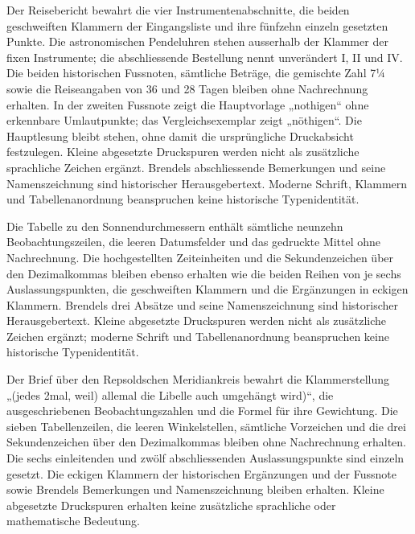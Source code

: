 Der Reisebericht bewahrt die vier Instrumentenabschnitte, die beiden geschweiften Klammern der Eingangsliste und ihre fünfzehn einzeln gesetzten Punkte. Die astronomischen Pendeluhren stehen ausserhalb der Klammer der fixen Instrumente; die abschliessende Bestellung nennt unverändert I, II und IV. Die beiden historischen Fussnoten, sämtliche Beträge, die gemischte Zahl 7¼ sowie die Reiseangaben von 36 und 28 Tagen bleiben ohne Nachrechnung erhalten. In der zweiten Fussnote zeigt die Hauptvorlage „nothigen“ ohne erkennbare Umlautpunkte; das Vergleichsexemplar zeigt „nöthigen“. Die Hauptlesung bleibt stehen, ohne damit die ursprüngliche Druckabsicht festzulegen. Kleine abgesetzte Druckspuren werden nicht als zusätzliche sprachliche Zeichen ergänzt. Brendels abschliessende Bemerkungen und seine Namenszeichnung sind historischer Herausgebertext. Moderne Schrift, Klammern und Tabellenanordnung beanspruchen keine historische Typenidentität.

Die Tabelle zu den Sonnendurchmessern enthält sämtliche neunzehn Beobachtungszeilen, die leeren Datumsfelder und das gedruckte Mittel ohne Nachrechnung. Die hochgestellten Zeiteinheiten und die Sekundenzeichen über den Dezimalkommas bleiben ebenso erhalten wie die beiden Reihen von je sechs Auslassungspunkten, die geschweiften Klammern und die Ergänzungen in eckigen Klammern. Brendels drei Absätze und seine Namenszeichnung sind historischer Herausgebertext. Kleine abgesetzte Druckspuren werden nicht als zusätzliche Zeichen ergänzt; moderne Schrift und Tabellenanordnung beanspruchen keine historische Typenidentität.

Der Brief über den Repsoldschen Meridiankreis bewahrt die Klammerstellung „(jedes 2mal, weil) allemal die Libelle auch umgehängt wird)“, die ausgeschriebenen Beobachtungszahlen und die Formel für ihre Gewichtung. Die sieben Tabellenzeilen, die leeren Winkelstellen, sämtliche Vorzeichen und die drei Sekundenzeichen über den Dezimalkommas bleiben ohne Nachrechnung erhalten. Die sechs einleitenden und zwölf abschliessenden Auslassungspunkte sind einzeln gesetzt. Die eckigen Klammern der historischen Ergänzungen und der Fussnote sowie Brendels Bemerkungen und Namenszeichnung bleiben erhalten. Kleine abgesetzte Druckspuren erhalten keine zusätzliche sprachliche oder mathematische Bedeutung.

